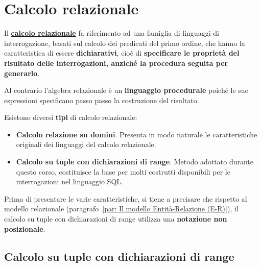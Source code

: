 \documentclass[a4paper]{article}
\begin{document}
	\section{Calcolo relazionale}
	
	Il \textcolor{Red3}{\underline{\textbf{calcolo relazionale}}} fa riferimento ad una famiglia di linguaggi di interrogazione, basati sul calcolo dei predicati del primo ordine, che hanno la caratteristica di essere \textbf{dichiarativi}, cioè di \textbf{specificare le proprietà del risultato delle interrogazioni, anziché la procedura seguita per generarlo}.
	
	Al contrario l'algebra relazionale è un \textbf{linguaggio procedurale} poiché le sue espressioni specificano passo passo la costruzione del risultato.\newline
	
	\noindent
	Esistono diversi \textbf{tipi} di calcolo relazionale:
	\begin{itemize}
		\item \textbf{Calcolo relazione su domini}. Presenta in modo naturale le caratteristiche originali dei linguaggi del calcolo relazionale.
		
		\item \textbf{Calcolo su tuple con dichiarazioni di range}. Metodo adottato durante questo corso, costituisce la base per molti costrutti disponibili per le interrogazioni nel linguaggio SQL.
	\end{itemize}
	Prima di presentare le varie caratteristiche, si tiene a precisare che rispetto al modello relazionale (paragrafo~\ref{par: Il modello Entità-Relazione (E-R)}), il calcolo su tuple con dichiarazioni di range utilizza una \textbf{notazione non posizionale}.\newpage
	
	\subsection{Calcolo su tuple con dichiarazioni di range}
	
\end{document}
